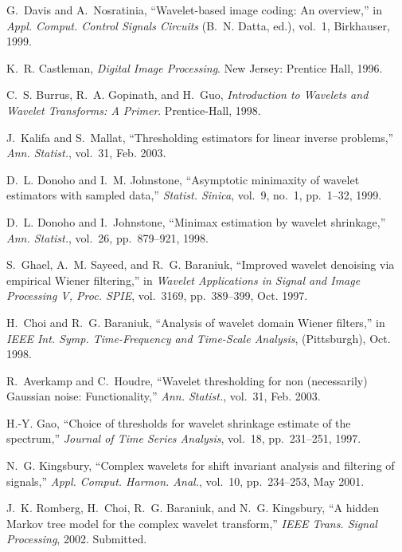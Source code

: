 \documentclass[11pt]{article}
\begin{document}
\begin{thebibliography}{10}
G.~Davis and A.~Nosratinia, ``Wavelet-based image coding: {A}n overview,'' in
  {\em Appl. Comput. Control Signals Circuits} (B.~N. Datta, ed.), vol.~1,
  Birkhauser, 1999.

K.~R. Castleman, {\em Digital Image Processing}.
\newblock New Jersey: Prentice Hall, 1996.

C.~S. Burrus, R.~A. Gopinath, and H.~Guo, {\em Introduction to Wavelets and
  Wavelet Transforms: {A} Primer}.
\newblock Prentice-Hall, 1998.

J.~Kalifa and S.~Mallat, ``Thresholding estimators for linear inverse
  problems,'' {\em Ann. Statist.}, vol.~31, Feb. 2003.

D.~L. Donoho and I.~M. Johnstone, ``Asymptotic minimaxity of wavelet estimators
  with sampled data,'' {\em Statist. Sinica}, vol.~9, no.~1, pp.~1--32, 1999.

D.~L. Donoho and I.~Johnstone, ``Minimax estimation by wavelet shrinkage,''
  {\em Ann. Statist.}, vol.~26, pp.~879--921, 1998.

S.~Ghael, A.~M. Sayeed, and R.~G. Baraniuk, ``Improved wavelet denoising via
  empirical {W}iener filtering,'' in {\em Wavelet Applications in Signal and
  Image Processing V, Proc. SPIE}, vol.~3169, pp.~389--399, Oct. 1997.

H.~Choi and R.~G. Baraniuk, ``Analysis of wavelet domain {W}iener filters,'' in
  {\em IEEE Int. Symp. Time-Frequency and Time-Scale Analysis}, (Pittsburgh),
  Oct. 1998.

R.~Averkamp and C.~Houdre, ``Wavelet thresholding for non (necessarily)
  {G}aussian noise: {F}unctionality,'' {\em Ann. Statist.}, vol.~31, Feb. 2003.

H.-Y. Gao, ``Choice of thresholds for wavelet shrinkage estimate of the
  spectrum,'' {\em Journal of Time Series Analysis}, vol.~18, pp.~231--251,
  1997.

N.~G. Kingsbury, ``Complex wavelets for shift invariant analysis and filtering
  of signals,'' {\em Appl. Comput. Harmon. Anal.}, vol.~10, pp.~234--253, May
  2001.

J.~K. Romberg, H.~Choi, R.~G. Baraniuk, and N.~G. Kingsbury, ``A hidden
  {M}arkov tree model for the complex wavelet transform,'' {\em IEEE Trans.
  Signal Processing}, 2002.
\newblock Submitted.


\end{thebibliography}
\end{document}
